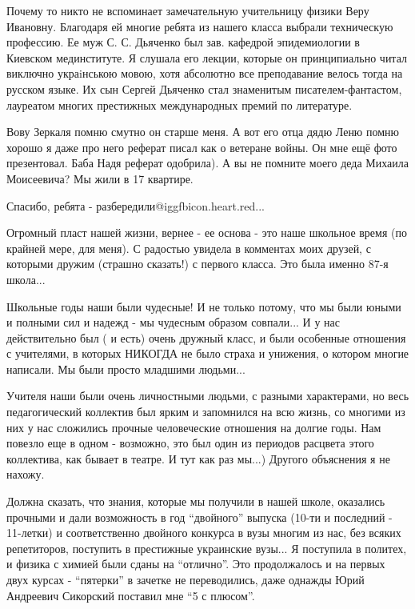 \begin{itemize}
Почему то никто не вспоминает замечательную учительницу физики Веру
Ивановну. Благодаря ей многие ребята из нашего класса выбрали техническую
профессию. Ее муж С. С. Дьяченко был зав. кафедрой эпидемиологии в Киевском
мединституте. Я слушала его лекции, которые он принципиально читал виключно
украiнською мовою, хотя абсолютно все преподавание велось тогда на русском
языке. Их сын Сергей Дьяченко стал знаменитым писателем-фантастом, лауреатом
многих престижных международных премий по литературе.

\begin{itemize} %

Вову Зеркаля помню смутно он старше меня. А вот его отца дядю Леню помню хорошо
я даже про него реферат писал как о ветеране войны. Он мне ещё фото
презентовал. Баба Надя реферат одобрила). А вы не помните моего деда Михаила
Моисеевича? Мы жили в 17 квартире.

\end{itemize} %


Спасибо, ребята - разбередили@igg{fbicon.heart.red}...

Огромный пласт нашей жизни, вернее - ее основа - это наше школьное время (по
крайней мере, для меня). С радостью увидела в комментах моих друзей, с которыми
дружим (страшно сказать!) с первого класса. Это была именно 87-я школа...

Школьные годы наши были чудесные! И не только потому, что мы были юными и
полными сил и надежд - мы чудесным образом совпали... И у нас действительно был
( и есть) очень дружный класс, и были особенные отношения с учителями, в
которых НИКОГДА не было страха и унижения, о котором многие написали. Мы были
просто младшими людьми...

Учителя наши были очень личностными людьми, с разными характерами, но весь
педагогический коллектив был ярким и запомнился на всю жизнь, со многими из них
у нас сложились прочные человеческие отношения на долгие годы. Нам повезло еще
в одном - возможно, это был один из периодов расцвета этого коллектива, как
бывает в театре. И тут как раз мы...) Другого объяснения я не нахожу.

Должна сказать, что знания, которые мы получили в нашей школе, оказались
прочными и дали возможность в год \enquote{двойного} выпуска (10-ти и последний
- 11-летки) и соответственно двойного конкурса в вузы многим из нас, без всяких
репетиторов, поступить в престижные украинские вузы... Я поступила в политех, и
физика с химией были сданы на \enquote{отлично}. Это продолжалось и на первых
двух курсах - \enquote{пятерки} в зачетке не переводились, даже однажды Юрий
Андреевич Сикорский поставил мне \enquote{5 с плюсом}.


\end{itemize}
